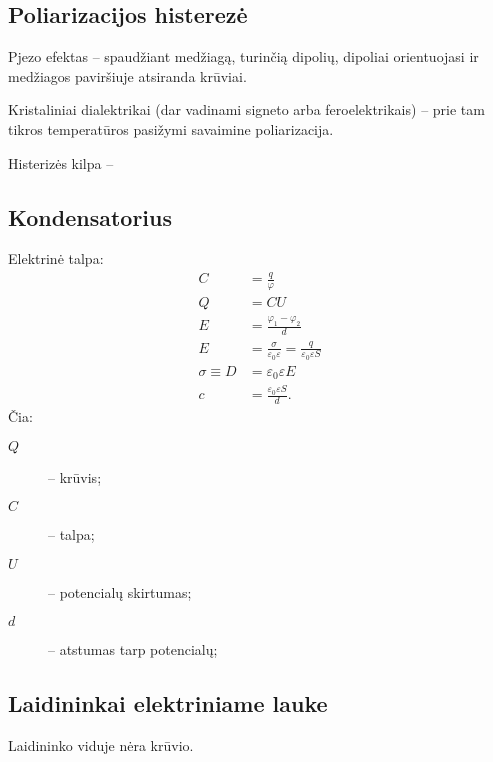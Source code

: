 \subsection{Poliarizacijos histerezė}

Pjezo efektas – spaudžiant medžiagą, turinčią dipolių, dipoliai
orientuojasi ir medžiagos paviršiuje atsiranda krūviai.

Kristaliniai dialektrikai (dar vadinami signeto arba feroelektrikais) – 
prie tam tikros temperatūros pasižymi savaimine poliarizacija.

Histerizės kilpa –

\subsection{Kondensatorius}

Elektrinė talpa:
\begin{align*}
  C &= \frac{q}{\varphi} \\
  Q &= CU \\
  E &= \frac{\varphi_{1} - \varphi_{2}}{d} \\
  E &= \frac{\sigma}{\varepsilon_{0}\varepsilon} = 
  \frac{q}{\varepsilon_{0}\varepsilon S} \\
  \sigma \equiv D &= \varepsilon_{0} \varepsilon E \\
  c &= \frac{\varepsilon_{0} \varepsilon S}{d}.
\end{align*}
Čia:
\begin{description}
  \item[$Q$] – krūvis;
  \item[$C$] – talpa;
  \item[$U$] – potencialų skirtumas;
  \item[$d$] – atstumas tarp potencialų;
\end{description}

\subsection{Laidininkai elektriniame lauke}

Laidininko viduje nėra krūvio.
